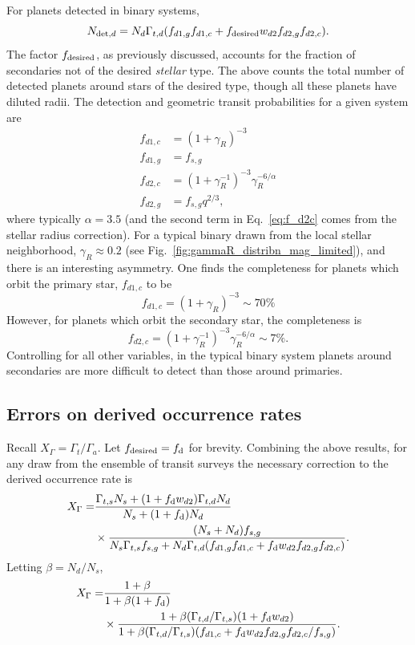 \documentclass{emulateapj}
\begin{document}
For planets detected in binary systems,
\begin{equation}
N_{{\rm det},d}
= 
N_d \Gamma_{t,d} (f_{d1,g}f_{d1,c} + f_{\rm desired}w_{d2}f_{d2,g}f_{d2,c}).
\label{eq:N_det_d_model2}
\end{equation}
The factor $f_{\rm desired}$, as previously discussed, accounts for the 
fraction of secondaries not of the desired {\it stellar} type. The above 
counts the total number of detected planets around stars of the desired type, 
though all these planets have diluted radii.
The detection and geometric transit probabilities for a given system are
\begin{align}
f_{d1,c} &= (1+\gamma_R)^{-3} \\
f_{d1,g} &= f_{s,g} \\
f_{d2,c} &= (1+\gamma_R^{-1})^{-3} \gamma_R^{-6/\alpha} 
\label{eq:f_d2c}\\
f_{d2,g} &= f_{s,g}q^{2/3},
\end{align}
where typically $\alpha=3.5$ (and the second term in Eq.~\ref{eq:f_d2c} comes 
from the stellar radius correction).
For a typical binary drawn from the local stellar neighborhood, $\gamma_R 
\approx 0.2$ (see Fig.~\ref{fig:gammaR_distribn_mag_limited}), and there is an 
interesting asymmetry.
One finds the completeness for planets which orbit the primary star, 
$f_{d1,c}$ to be
\begin{equation}
f_{d1,c} = (1+\gamma_R)^{-3} \sim 70\%
\end{equation}
However, for planets which orbit the secondary star, the completeness is
\begin{equation}
f_{d2,c} = (1+\gamma_R^{-1})^{-3} \gamma_R^{-6/\alpha} \sim 7\%.
\end{equation}
Controlling for all other variables, in the typical binary system planets 
around secondaries are more difficult to detect than those around primaries.

\subsection{Errors on derived occurrence rates}

Recall $X_\Gamma = \Gamma_t / \Gamma_a$. Let $f_{\rm desired} = f_{\rm d}$ for 
brevity.
Combining the above results, for any draw from the ensemble of transit 
surveys the necessary correction to the derived occurrence rate is
\begin{align}
X_\Gamma =
&\frac{\Gamma_{t,s}N_s + (1+f_{\rm d}w_{d2})\Gamma_{t,d}N_d }{N_s + (1+f_{\rm 
d})N_d}
\nonumber \\
&\times
\frac{(N_s + N_d)f_{s,g}}{N_s \Gamma_{t,s} f_{s,g} + N_d \Gamma_{t,d}
      (f_{d1,g}f_{d1,c} + f_{\rm d}w_{d2}f_{d2,g}f_{d2,c})  }.
\end{align}
Letting $\beta = N_d/N_s$, 
\begin{align}
X_\Gamma =
&\frac{1+\beta}{1 + \beta(1+f_{\rm d})} 
\nonumber \\
&\times
\frac{ 1+ \beta (\Gamma_{t,d}/\Gamma_{t,s}) (1+f_{\rm d}w_{d2}) }
{1 +\beta(\Gamma_{t,d}/\Gamma_{t,s})(f_{d1,c} + f_{\rm 
d}w_{d2}f_{d2,g}f_{d2,c}/f_{s,g})}.
\end{align}
\end{document}
